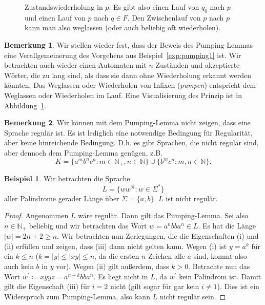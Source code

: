 \documentclass[11pt, a4paper]{article}
\theoremstyle{definition}
\newtheorem{example}[definition]{Beispiel}
\newtheorem*{remark*}{Bemerkung}
\theoremstyle{plain}
\numberwithin{equation}{section}
\begin{document}
\begin{figure}
	\centering
	
	\caption{Zustandswiederholung in $p$. Es gibt also einen Lauf von $q_0$ nach $p$ und einen Lauf von $p$ nach $q \in F$. Den Zwischenlauf von $p$ nach $p$ kann man also weglassen (oder auch beliebig oft wiederholen).}
	\label{fig:pumping}
\end{figure}
\begin{remark*}
	Wir stellen wieder fest, dass der Beweis des Pumping-Lemmas eine Verallgemeinerung des Vorgehens aus Beispiel~\ref{exp:pumping1} ist. Wir betrachten auch wieder einen Automaten mit $n$ Zuständen und akzeptierte Wörter, die zu lang sind, als dass sie dann ohne Wiederholung erkannt werden könnten. Das Weglassen oder Wiederholen von Infixen (\textit{pumpen}) entspricht dem Weglassen oder Wiederholen im Lauf.
	Eine Visualisierung des Prinzip ist in Abbildung~\ref{fig:pumping}.
\end{remark*}
\begin{remark*}
	Wir können mit dem Pumping-Lemma nicht zeigen, dass eine Sprache regulär ist. Es ist lediglich eine notwendige Bedingung für Regularität, aber keine hinreichende Bedingung. D.h. es gibt Sprachen, die nicht regulär sind, aber dennoch dem Pumping-Lemma genügen, z.B.
	$$
		K = \{a^m b^n c^n : m \in \mathbb{N}_+, n \in \mathbb{N} \} \cup \{ b^m c^n : m, n \in \mathbb{N} \}.
	$$
\end{remark*}
\begin{example}
	Wir betrachten die Sprache
	$$
		L = \{ ww^\mathcal{R} : w \in \Sigma^\ast \}
	$$
	aller Palindrome gerader Länge über $\Sigma = \{a, b\}$. $L$ ist nicht regulär.
	\begin{proof}
		Angenommen $L$ wäre regulär. Dann gilt das Pumping-Lemma. Sei also $n \in \mathbb{N}_+$ beliebig und wir betrachten das Wort $w = a^n bb a^n \in L$. Es hat die Länge $|w| = 2n+2 \geq n$. Wir betrachten nun Zerlegungen, die die Eigenschaften (i) und (ii) erfüllen und zeigen, dass (iii) dann nicht gelten kann. Wegen (i) ist $y = a^k$ für ein $k \leq n$ ($k = |y| \leq |xy| \leq n$, da die ersten $n$ Zeichen alle $a$ sind, kommt also auch kein $b$ in $y$ vor). Wegen (ii) gilt außerdem, dass $k > 0$. Betrachte nun das Wort $w^\prime \coloneqq xyyz = a^{n+k}bba^n$. Es liegt nicht in $L$, da $w^\prime$ kein Palindrom ist. Damit gilt die Eigenschaft (iii) für $i = 2$ nicht (gilt sogar für gar kein $i \neq 1$). Dies ist ein Widerspruch zum Pumping-Lemma, also kann $L$ nicht regulär sein. 
	\end{proof}
\end{example}
\end{document}
